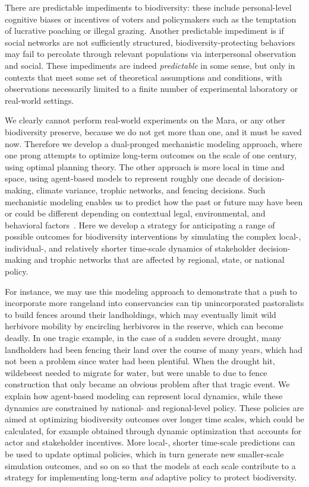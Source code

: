 \documentclass{article}
\theoremstyle{mytheorem}
\theoremstyle{myremark}
\begin{document}
There are predictable impediments to biodiversity: these
include personal-level cognitive biases or incentives of voters and policymakers
such as the temptation of lucrative poaching or illegal grazing.  Another
predictable impediment is if social networks are not sufficiently structured,
biodiversity-protecting behaviors may fail to percolate through relevant
populations via interpersonal observation and social. These impediments are indeed
\emph{predictable} in some sense, but only in contexts that meet some set of
theoretical assumptions and conditions, with observations necessarily limited to a
finite number of experimental laboratory or real-world settings. 

We clearly cannot
perform real-world experiments on the Mara, or any other biodiversity preserve,
because we do not get more than one, and it must be saved now. Therefore we 
develop a dual-pronged mechanistic modeling approach, where one prong attempts
to optimize long-term outcomes on the scale of one century, 
using optimal planning theory. The other approach
is more local in time and space, using agent-based models to represent 
roughly one decade of decision-making, climate variance, trophic networks, and
fencing decisions. Such mechanistic modeling enables us to predict how the past or future may have been or
could be different depending on contextual legal, environmental, and behavioral
factors~\cite{Turner2022}. Here we develop a
strategy for anticipating a range of possible outcomes for biodiversity
interventions by simulating the complex local-, individual-, and relatively
shorter time-scale dynamics of stakeholder decision-making and trophic networks
that are affected by regional, state, or national policy. 

For instance, we may use this modeling approach to
demonstrate that a push to incorporate more rangeland into conservancies can tip
unincorporated pastoralists to build fences around their landholdings, which may
eventually limit wild herbivore mobility by encircling herbivores in the reserve,
which can become deadly. In one tragic example, in the case of a sudden severe
drought, many landholders had been fencing their land over the course of many
years, which had not been a problem since water had been plentiful. When the
drought hit, wildebeest needed to migrate for water, but were unable to due to
fence construction that only became an obvious problem after that tragic event.
We explain how agent-based modeling can represent local dynamics, while these
dynamics are constrained by national- and regional-level policy. These policies 
are aimed at optimizing biodiversity outcomes over longer time scales, 
which could be calculated, for example obtained through dynamic
optimization that accounts for actor and stakeholder incentives. More local-,
shorter time-scale predictions can be used to update optimal policies, which
in turn generate new smaller-scale simulation outcomes, and so on so that
the models at each scale contribute to a strategy for implementing long-term
\emph{and} adaptive policy to protect biodiversity.
\end{document}

